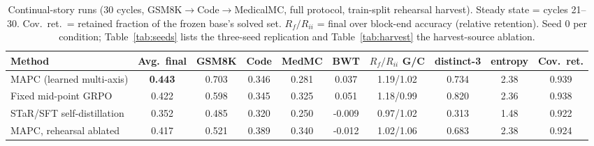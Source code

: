 \begin{table}[t]
\caption{Continual-story runs (30 cycles, GSM8K$\to$Code$\to$MedicalMC, full protocol, train-split rehearsal harvest). Steady state = cycles 21--30. Cov.\ ret.\ = retained fraction of the frozen base's solved set. $R_f/R_{ii}$ = final over block-end accuracy (relative retention). Seed 0 per condition; Table~\ref{tab:seeds} lists the three-seed replication and Table~\ref{tab:harvest} the harvest-source ablation.}
\label{tab:main}
\centering\footnotesize
\begin{tabular}{@{}lccccccccc@{}}
\toprule
Method & Avg.\ final & GSM8K & Code & MedMC & BWT & $R_f/R_{ii}$ G/C & distinct-3 & entropy & Cov.\ ret. \\
\midrule
MAPC (learned multi-axis) & \textbf{0.443} & 0.703 & 0.346 & 0.281 & 0.037 & 1.19/1.02 & 0.734 & 2.38 & 0.939 \\
Fixed mid-point GRPO & {0.422} & 0.598 & 0.345 & 0.325 & 0.051 & 1.18/0.99 & 0.820 & 2.36 & 0.938 \\
STaR/SFT self-distillation & {0.352} & 0.485 & 0.320 & 0.250 & -0.009 & 0.97/1.02 & 0.313 & 1.48 & 0.922 \\
MAPC, rehearsal ablated & {0.417} & 0.521 & 0.389 & 0.340 & -0.012 & 1.02/1.06 & 0.683 & 2.38 & 0.924 \\
\bottomrule
\end{tabular}
\end{table}
